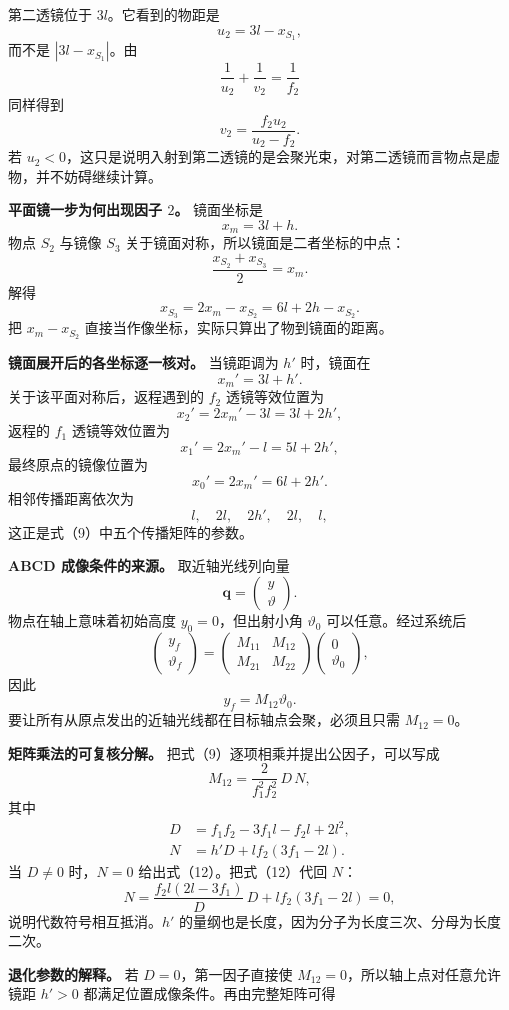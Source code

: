 \documentclass[12pt,a4paper,UTF8]{ctexart}
\begin{document}
第二透镜位于 \(3l\)。它看到的物距是 \[
u_2=3l-x_{S_1},
\] 而不是 \(|3l-x_{S_1}|\)。由 \[
\frac1{u_2}+\frac1{v_2}=\frac1{f_2}
\] 同样得到 \[
v_2=\frac{f_2u_2}{u_2-f_2}.
\] 若
\(u_2<0\)，这只是说明入射到第二透镜的是会聚光束，对第二透镜而言物点是虚物，并不妨碍继续计算。

\textbf{平面镜一步为何出现因子 \(2\)。} 镜面坐标是 \[
x_m=3l+h.
\] 物点 \(S_2\) 与镜像 \(S_3\) 关于镜面对称，所以镜面是二者坐标的中点：
\[
\frac{x_{S_2}+x_{S_3}}2=x_m.
\] 解得 \[
x_{S_3}=2x_m-x_{S_2}=6l+2h-x_{S_2}.
\] 把 \(x_m-x_{S_2}\) 直接当作像坐标，实际只算出了物到镜面的距离。

\textbf{镜面展开后的各坐标逐一核对。} 当镜距调为 \(h'\) 时，镜面在 \[
x_m'=3l+h'.
\] 关于该平面对称后，返程遇到的 \(f_2\) 透镜等效位置为 \[
x_2'=2x_m'-3l=3l+2h',
\] 返程的 \(f_1\) 透镜等效位置为 \[
x_1'=2x_m'-l=5l+2h',
\] 最终原点的镜像位置为 \[
x_0'=2x_m'=6l+2h'.
\] 相邻传播距离依次为 \[
l,\quad2l,\quad2h',\quad2l,\quad l,
\] 这正是式（9）中五个传播矩阵的参数。

\textbf{ABCD 成像条件的来源。} 取近轴光线列向量 \[
\boldsymbol q=\begin{pmatrix}y\\ \vartheta\end{pmatrix}.
\] 物点在轴上意味着初始高度 \(y_0=0\)，但出射小角 \(\vartheta_0\)
可以任意。经过系统后 \[
\begin{pmatrix}y_f\\ \vartheta_f\end{pmatrix}
=
\begin{pmatrix}M_{11}&M_{12}\\M_{21}&M_{22}\end{pmatrix}
\begin{pmatrix}0\\ \vartheta_0\end{pmatrix},
\] 因此 \[
y_f=M_{12}\vartheta_0.
\] 要让所有从原点发出的近轴光线都在目标轴点会聚，必须且只需
\(M_{12}=0\)。

\textbf{矩阵乘法的可复核分解。} 把式（9）逐项相乘并提出公因子，可以写成
\[
M_{12}=\frac{2}{f_1^2f_2^2}\,D\,N,
\] 其中 \[
\begin{aligned}
D&=f_1f_2-3f_1l-f_2l+2l^2,\\
N&=h'D+l f_2(3f_1-2l).
\end{aligned}
\] 当 \(D\ne0\) 时，\(N=0\) 给出式（12）。把式（12）代回 \(N\)： \[
N=
\frac{f_2l(2l-3f_1)}D\,D
+lf_2(3f_1-2l)=0,
\] 说明代数符号相互抵消。\(h'\)
的量纲也是长度，因为分子为长度三次、分母为长度二次。

\textbf{退化参数的解释。} 若 \(D=0\)，第一因子直接使
\(M_{12}=0\)，所以轴上点对任意允许镜距 \(h'>0\)
都满足位置成像条件。再由完整矩阵可得
\end{document}
